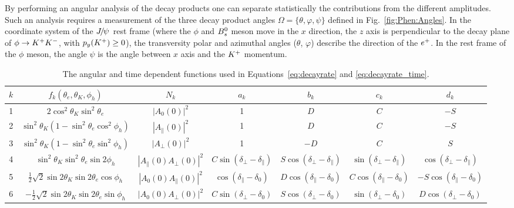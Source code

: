  By performing an angular analysis of the decay products one can separate statistically the contributions from the different amplitudes. Such an analysis requires a measurement of the three decay product angles $\Omega=\{\theta, \varphi, \psi\}$ defined in Fig.~\ref{fig:Phen:Angles}. In the coordinate system of the ${{J\mskip -3mu/\mskip -2mu\psi\mskip 2mu}}$ rest frame (where the $\phi$ and ${{B}^0_{s}}$ meson move in the $x$ direction, the $z$ axis is perpendicular to the decay plane of $\phi\rightarrow{\ensuremath{{K}^+}}{\ensuremath{{K}^-}}$, with $p_{y}({{K}^+})\geq0$), the transversity polar and azimuthal angles ($\theta$, $\varphi$) describe the direction of the ${e^+}$. In the rest frame of the $\phi$ meson, the angle $\psi$ is the angle between $x$ axis and the ${{K}^+}$ momentum. 

\begin{sidewaystable}[h]
   \caption{
The angular and time dependent functions used in Equations~\ref{eq:decayrate} and \ref{eq:decayrate_time}.
}
\begin{center}\begin{tabular}{c|c|c|c|c|c|c}
    \hline
    $k$    & $f_{k}(\theta_{e},\theta_{K},\phi_{h})$ & $N_{k}$ & $a_{k}$ & $b_{k}$ &  $c_{k}$ & $d_{k}$ \\ 
    \hline
    1   & $2\cos^{2}\theta_{K}\sin^{2}\theta_{e}$ & $|A_{0}(0)|^{2}$ &  1 & $D$ & $C$ & $-S$\\
    2   & $\sin^{2}\theta_{K}(1-\sin^{2}\theta_{e}\cos^{2}\phi_{h})$ & $|A_{\parallel}(0)|^{2}$ &  1 & $D$ & $C$ & $-S$\\
    3   & $\sin^{2}\theta_{K}(1-\sin^{2}\theta_{e}\sin^{2}\phi_{h})$ & $|A_{\perp}(0)|^{2}$ &  1 & $-D$ & $C$ & $S$\\
    4   & $\sin^{2}\theta_{K}\sin^{2}\theta_{e}\sin2\phi_{h}$ & $|A_{\parallel}(0)A_{\perp}(0)|^{2}$ &  $C\sin(\delta_{\perp}-\delta_{\parallel})$ & $S\cos(\delta_{\perp}-\delta_{\parallel})$ & $\sin(\delta_{\perp}-\delta_{\parallel})$ & $\cos(\delta_{\perp}-\delta_{\parallel})$\\
    5   & $\frac{1}{2}\sqrt{2}\sin2\theta_{K}\sin2\theta_{e}\cos\phi_{h}$ & $|A_{0}(0)A_{\parallel}(0)|^{2}$ & $\cos(\delta_{\parallel}-\delta_{0})$  & $D\cos(\delta_{\parallel}-\delta_{0})$ & $C\cos(\delta_{\parallel}-\delta_{0})$ & $-S\cos(\delta_{\parallel}-\delta_{0})$\\
    6   & $-\frac{1}{2}\sqrt{2}\sin2\theta_{K}\sin2\theta_{e}\sin\phi_{h}$ & $|A_{0}(0)A_{\perp}(0)|^{2}$ & $C\sin(\delta_{\perp}-\delta_{0})$  & $S\cos(\delta_{\perp}-\delta_{0})$ & $\sin(\delta_{\perp}-\delta_{0})$ & $D\cos(\delta_{\perp}-\delta_{0})$\\

\end{tabular}
\end{center}
\end{sidewaystable}
